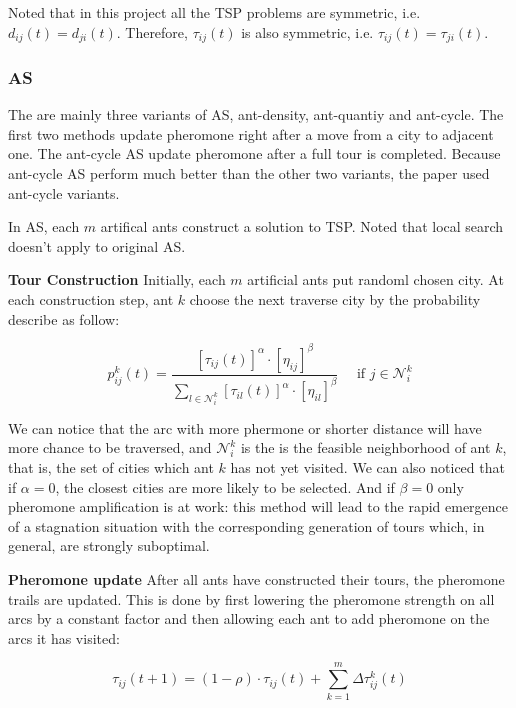 \documentclass[twocolumn, a4paper]{extarticle}
\begin{document}
Noted that in this project all the TSP problems are symmetric, i.e. $d_{ij}(t) = d_{ji}(t)$. Therefore, $\tau_{ij}(t)$ is also symmetric, i.e. $\tau_{ij}(t) = \tau_{ji}(t)$.

\subsubsection{AS}

The are mainly three variants of AS, ant-density, ant-quantiy and ant-cycle. The first two methods update pheromone right after a move from a city to adjacent one. The ant-cycle AS update pheromone after a full tour is completed. Because ant-cycle AS perform much better than the other two variants, the paper used ant-cycle variants.

In AS, each $m$ artifical ants construct a solution to TSP. Noted that local search doesn't apply to original AS.

\textbf{Tour Construction} Initially, each $m$ artificial ants put randoml chosen city. At each construction step, ant $k$ choose the next traverse city by the probability describe as follow:

\begin{equation}
	p_{i j}^k(t)=\frac{\left[\tau_{i j}(t)\right]^\alpha \cdot\left[\eta_{i j}\right]^\beta}{\sum_{l \in \mathcal{N}_i^k}\left[\tau_{i l}(t)\right]^\alpha \cdot\left[\eta_{i l}\right]^\beta} \quad \text { if } j \in \mathcal{N}_i^k
	\label{eq: choice}
\end{equation}

We can notice that the arc with more phermone or shorter distance will have more chance to be traversed, and $\mathcal{N}_i^k$ is the is the feasible neighborhood of ant $k$, that is, the set of cities which ant $k$ has not yet visited. We can also noticed that if $\alpha=0$, the closest cities are more likely to be selected. And if $\beta=0$ only pheromone amplification is at work: this method will lead to the rapid emergence of a stagnation situation with the corresponding generation of tours which, in general, are strongly suboptimal.

\textbf{Pheromone update} After all ants have constructed their tours, the pheromone trails are updated. This is done by first lowering the pheromone strength on all arcs by a constant factor and then allowing each ant to add pheromone on the arcs it has visited:

\begin{equation}
	\tau_{i j}(t+1)=(1-\rho) \cdot \tau_{i j}(t)+\sum_{k=1}^m \Delta \tau_{i j}^k(t)
\end{equation}
\end{document}
